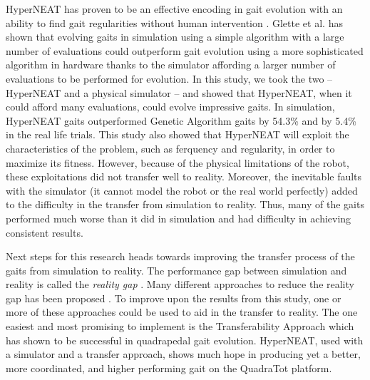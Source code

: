 HyperNEAT has proven to be an effective encoding in gait evolution with an ability to find gait regularities without human intervention \cite{clune2009evolving,clune2011performance,yos:clune}. 
Glette et al. \cite{glette} has shown that evolving gaits in simulation using a simple algorithm with a large number of evaluations could outperform gait evolution using a more sophisticated algorithm in hardware thanks to the simulator affording a larger number of evaluations to be performed for evolution. 
In this study, we took the two -- HyperNEAT and a physical simulator -- and showed that HyperNEAT, when it could afford many evaluations, could evolve impressive gaits. 
In simulation, HyperNEAT gaits outperformed Genetic Algorithm gaits \cite{glette} by 54.3\% and by 5.4\% in the real life trials. 
This study also showed that HyperNEAT will exploit the characteristics of the problem, such as ferquency and regularity, in order to maximize its fitness.
However, because of the physical limitations of the robot, these exploitations did not transfer well to reality. %
Moreover, the inevitable faults with the simulator (it cannot model the robot or the real world perfectly) added to the difficulty in the transfer from simulation to reality. 
Thus, many of the gaits performed much worse than it did in simulation and had difficulty in achieving consistent results. 


Next steps for this research heads towards improving the transfer process of the gaits from simulation to reality. 
The performance gap between simulation and reality is called the \emph{reality gap} \cite{jakobi}. 
Many different approaches to reduce the reality gap has been proposed \cite{koos2010crossing,bongard,zagal}. 
To improve upon the results from this study, one or more of these approaches could be used to aid in the transfer to reality. 
The one easiest and most promising to implement is the Transferability Approach \cite{koos2011transferability} which has shown to be successful in quadrapedal gait evolution. 
HyperNEAT, used with a simulator and a transfer approach, shows much hope in producing yet a better, more coordinated, and higher performing gait on the QuadraTot platform. 
